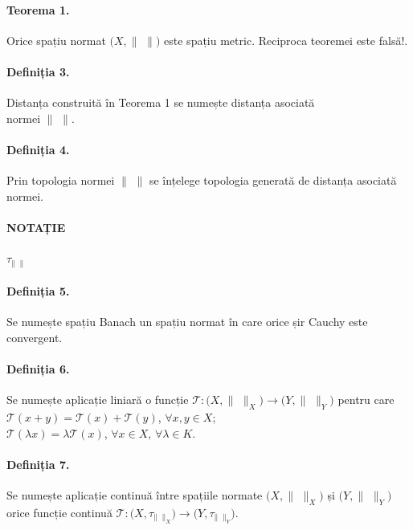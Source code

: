\paragraph{Teorema 1.}
Orice spațiu normat $(X, \lVert$ $\rVert)$ este spațiu metric. Reciproca teoremei este falsă!.

\paragraph{Definiția 3.}
Distanța construită în Teorema 1 se numește distanța asociată \\ 
normei $\lVert$ $\rVert$.

\paragraph{Definiția 4.}
Prin topologia normei $\lVert$ $\rVert$ se înțelege topologia generată de distanța asociată normei.

\paragraph{NOTAȚIE}
$\tau_{\displaystyle\lVert}$ $_{\displaystyle\rVert}$

\paragraph{Definiția 5.}
Se numește spațiu Banach un spațiu normat în care orice șir Cauchy este convergent.

\paragraph{Definiția 6.}
Se numește aplicație liniară o funcție $\mathcal{T}:(X, \lVert$ $\rVert_{X}) \rightarrow (Y, \lVert$ $\rVert_{Y})$ pentru care \\
$\mathcal{T}(x+y) = \mathcal{T}(x) + \mathcal{T}(y)$, $\forall x, y \in X$; \\
$\mathcal{T}(\lambda x) = \lambda \mathcal{T}(x)$, $\forall x \in X$, $\forall \lambda \in K$.

\paragraph{Definiția 7.}
Se numește aplicație continuă între spațiile normate $(X, \lVert$ $\rVert_{X})$ și $(Y, \lVert$ $\rVert_{Y})$ orice funcție continuă
$\mathcal{T}:(X, \tau_{\lVert}$ $_{\rVert_{X}}) \rightarrow (Y, \tau_{\lVert}$ $_{\rVert_{Y}})$.

